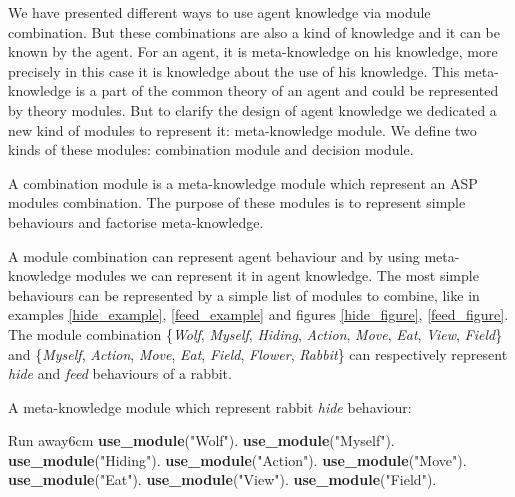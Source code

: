 \documentclass{aamas2012}
\begin{document}
	We have presented different ways to use agent knowledge via module combination.
	But these combinations are also a kind of knowledge and it can be known by the agent.
	For an agent, it is meta-knowledge on his knowledge, more precisely in this case it is knowledge about the use of his knowledge.
	This meta-knowledge is a part of the common theory of an agent and could be represented by theory modules.
	But to clarify the design of agent knowledge we dedicated a new kind of modules to represent it: meta-knowledge module.
	We define two kinds of these modules: combination module and decision module.
	
	\begin{definition}
		A combination module is a meta-knowledge module which represent an ASP modules combination.	
		The purpose of these modules is to represent simple behaviours and factorise meta-knowledge.
	\end{definition}
	
	A module combination can represent agent behaviour and by using meta-knowledge modules we can represent it in agent knowledge.
	The most simple behaviours can be represented by a simple list of modules to combine, like in examples \ref{hide_example}, 
	\ref{feed_example} and figures \ref{hide_figure}, \ref{feed_figure}.
	The module combination \{\emph{Wolf}, \emph{Myself}, \emph{Hiding}, \emph{Action}, \emph{Move}, \emph{Eat}, \emph{View}, \emph{Field}\} 
	and \{\emph{Myself}, \emph{Action}, \emph{Move}, \emph{Eat}, \emph{Field}, \emph{Flower}, \emph{Rabbit}\} 
	can respectively represent \emph{hide} and \emph{feed} behaviours of a rabbit.
	
	\begin{example}
		\label{hide_example}
		A meta-knowledge module which represent rabbit \emph{hide} behaviour:\newline
		\begin{module}{Run away}{6cm}
			\textbf{use\_module}("Wolf").\newline
			\textbf{use\_module}("Myself").\newline
			\textbf{use\_module}("Hiding").\newline
			\textbf{use\_module}("Action").\newline
			\textbf{use\_module}("Move").\newline
			\textbf{use\_module}("Eat").\newline
			\textbf{use\_module}("View").\newline
			\textbf{use\_module}("Field").
		\end{module}
	\end{example}
	
\end{document}

